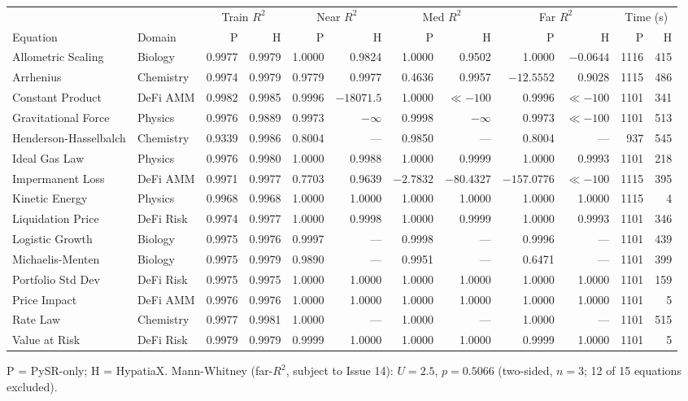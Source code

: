 \documentclass[11pt]{article}
\begin{document}
\begin{center}
\tiny
\begin{tabular}{llrrrrrrrrrr}
\toprule
 & & \multicolumn{2}{c}{Train $R^2$} & \multicolumn{2}{c}{Near $R^2$} & \multicolumn{2}{c}{Med $R^2$} & \multicolumn{2}{c}{Far $R^2$} & \multicolumn{2}{c}{Time (s)} \\
Equation & Domain & P & H & P & H & P & H & P & H & P & H \\
\midrule
Allometric Scaling & Biology & 0.9977 & 0.9979 & 1.0000 & 0.9824 & 1.0000 & 0.9502 & 1.0000 & $-0.0644$ & 1116 & 415 \\
Arrhenius & Chemistry & 0.9974 & 0.9979 & 0.9779 & 0.9977 & 0.4636 & 0.9957 & $-12.5552$ & 0.9028 & 1115 & 486 \\
Constant Product & DeFi AMM & 0.9982 & 0.9985 & 0.9996 & $-18071.5$ & 1.0000 & $\ll{-100}$ & 0.9996 & $\ll{-100}$ & 1101 & 341 \\
Gravitational Force & Physics & 0.9976 & 0.9889 & 0.9973 & $-\infty$ & 0.9998 & $-\infty$ & 0.9973 & $\ll{-100}$ & 1101 & 513 \\
Henderson-Hasselbalch & Chemistry & 0.9339 & 0.9986 & 0.8004 & --- & 0.9850 & --- & 0.8004 & --- & 937 & 545 \\
Ideal Gas Law & Physics & 0.9976 & 0.9980 & 1.0000 & 0.9988 & 1.0000 & 0.9999 & 1.0000 & 0.9993 & 1101 & 218 \\
Impermanent Loss & DeFi AMM & 0.9971 & 0.9977 & 0.7703 & 0.9639 & $-2.7832$ & $-80.4327$ & $-157.0776$ & $\ll{-100}$ & 1115 & 395 \\
Kinetic Energy & Physics & 0.9968 & 0.9968 & 1.0000 & 1.0000 & 1.0000 & 1.0000 & 1.0000 & 1.0000 & 1115 & 4 \\
Liquidation Price & DeFi Risk & 0.9974 & 0.9977 & 1.0000 & 0.9998 & 1.0000 & 0.9999 & 1.0000 & 0.9993 & 1101 & 346 \\
Logistic Growth & Biology & 0.9975 & 0.9976 & 0.9997 & --- & 0.9998 & --- & 0.9996 & --- & 1101 & 439 \\
Michaelis-Menten & Biology & 0.9975 & 0.9979 & 0.9890 & --- & 0.9951 & --- & 0.6471 & --- & 1101 & 399 \\
Portfolio Std Dev & DeFi Risk & 0.9975 & 0.9975 & 1.0000 & 1.0000 & 1.0000 & 1.0000 & 1.0000 & 1.0000 & 1101 & 159 \\
Price Impact & DeFi AMM & 0.9976 & 0.9976 & 1.0000 & 1.0000 & 1.0000 & 1.0000 & 1.0000 & 1.0000 & 1101 & 5 \\
Rate Law & Chemistry & 0.9977 & 0.9981 & 1.0000 & --- & 1.0000 & --- & 1.0000 & --- & 1101 & 515 \\
Value at Risk & DeFi Risk & 0.9979 & 0.9979 & 0.9999 & 1.0000 & 1.0000 & 1.0000 & 0.9999 & 1.0000 & 1101 & 5 \\
\bottomrule
\end{tabular}
\end{center}
{\small P = PySR-only; H = HypatiaX. Mann-Whitney (far-$R^2$, subject to
Issue 14): $U=2.5$, $p=0.5066$ (two-sided, $n=3$; 12 of 15 equations
excluded).}
\end{document}
